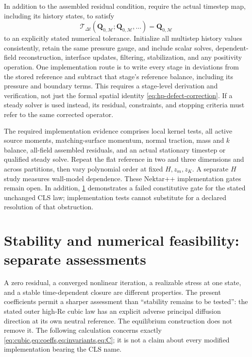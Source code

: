 \documentclass[11pt,a4paper]{article}
\numberwithin{equation}{section}
\begin{document}
In addition to the assembled residual condition, require the actual
timestep map, including its history states, to satisfy
\begin{equation}
 \boxed{\mathcal T_{\Delta t}
 (\bm Q_{0,\mathcal M};\bm Q_{0,\mathcal M},\ldots)
 =\bm Q_{0,\mathcal M}}
 \label{eq:hp-time-fixedpoint}
\end{equation}
to an explicitly stated numerical tolerance. Initialize all multistep
history values consistently, retain the same pressure gauge, and
include scalar solves, dependent-field reconstruction, interface
updates, filtering, stabilization, and any positivity operation.
One implementation route is to write every stage in deviations from
the stored reference and subtract that stage's reference balance,
including its pressure and boundary terms. This requires a stage-level
derivation and verification, not just the formal spatial identity
\cref{eq:hp-defect-correction}. If a steady solver is used instead,
its residual, constraints, and stopping criteria must refer to the
same corrected operator.

The required implementation evidence comprises local kernel tests,
all active source moments, matching-surface momentum, normal traction, mass and $k$ balance,
all-field assembled residuals, and an actual stationary timestep or
qualified steady solve. Repeat the flat reference in two and three
dimensions and across partitions, then vary polynomial order at fixed
$H,z_m,z_K$. A separate $H$ study measures wall-model dependence.
These Nektar++ implementation gates remain open. In addition,
\cref{sec:stability} demonstrates a failed constitutive gate for the
stated unchanged CLS law; implementation tests cannot substitute
for a declared resolution of that obstruction.

\section{Stability and numerical feasibility: separate assessments}
\label{sec:stability}
A zero residual, a converged nonlinear iteration, a realizable stress
at one state, and a stable time-dependent closure are different
properties. The present coefficients permit a sharper assessment than
``stability remains to be tested'': the stated outer high-Re cubic law
has an explicit adverse principal diffusion direction at its own
neutral reference. The equilibrium construction does not remove it.
The following calculation concerns exactly
\cref{eq:cubic,eq:coeffs,eq:invariants,eq:C}; it is not a claim about
every modified implementation bearing the CLS name.
\end{document}
